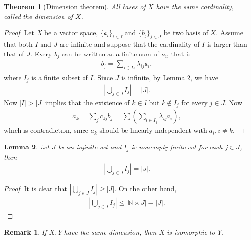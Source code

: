\documentclass[11pt]{book}
\newtheorem{theorem}{Theorem}[chapter]
\newtheorem{lemma}[theorem]{Lemma}
\newtheorem{remark}{Remark}[chapter]
\theoremstyle{definition}
\numberwithin{equation}{chapter}
\begin{document}
\begin{theorem}[Dimension theorem]
All bases of $X$ have the same cardinality, called the dimension of $X$.
\end{theorem}
\begin{proof}
Let $X$ be a vector space, $\{a_i\}_{i \in I}$ and $\{b_j\}_{j \in J}$ be two basis of $X$. Assume that both $I$ and $J$ are infinite and suppose that the cardinality of $I$ is larger than that of $J$. Every $b_j$ can be written as a finite sum of $a_i$, that is
\begin{align*}
    b_j = \sum_{i \in I_j} \lambda_{ij} a_i,
\end{align*}
where $I_j$ is a finite subset of $I$. Since $J$ is infinite, by Lemma \ref{lemma_159}, we have
\begin{align*}
    \left|\bigcup_{j \in J} I_j\right| = \left|J\right|.
\end{align*}
Now $\left|I\right| > \left|J\right|$ implies that the existence of $k \in I$ but $k \notin I_j$ for every $j \in J$. Now 
\begin{align*}
    a_k = \sum_j c_{kj} b_j = \sum \left(\sum_{i \in I_j} \lambda_{ij} a_i\right),
\end{align*}
which is contradiction, since $a_k$ should be linearly independent with $a_i, i \neq k$.
\end{proof}

\medskip

\begin{lemma}\label{lemma_159}
Let $J$ be an infinite set and $I_j$ is nonempty finite set for each $j \in J$, then 
\begin{align*}
    \left|\bigcup_{j \in J} I_j\right| = \left|J\right|.
\end{align*}
\end{lemma}
\begin{proof}
It is clear that $\left|\bigcup_{j \in J} I_j\right| \geq \left|J\right|$. On the other hand, \begin{align*}
    \left|\bigcup_{j \in J} I_j\right| \leq \left|\mathbb{N} \times J\right| = \left|J\right|.
\end{align*}
\end{proof}

\begin{remark}
If $X, Y$ have the same dimension, then $X$ is isomorphic to $Y$.
\end{remark}

\medskip
\end{document}
